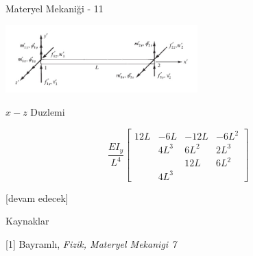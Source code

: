 \documentclass[12pt,fleqn]{article}\usepackage{../../common}
\begin{document}
Materyel Mekaniği - 11


\includegraphics[width=20em]{phy_020_strs_11_01.jpg}


$x-z$ Duzlemi

$$
\frac{EI_y}{L^4}
\left[\begin{array}{cccc}
12L & -6L  & -12L & -6L^2 \\
    & 4L^3 & 6L^2 & 2L^3  \\
    &      & 12L  & 6L^2  \\
                  & 4L^3
\end{array}\right]
$$











[devam edecek]

Kaynaklar

[1] Bayramlı, {\em Fizik, Materyel Mekanigi 7}
\end{document}
